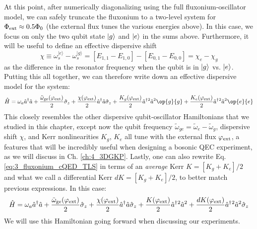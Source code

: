 At this point, after numerically diagonalizing using the full fluxonium-oscillator model, we can safely truncate the fluxonium to a two-level system for $\Phi_{\rm ext} \approx 0.5\Phi_0$ (the external flux tunes the various energies above). In this case, we focus on only the two qubit state $\lvert g\rangle$ and $\lvert e\rangle$ in the sums above. Furthermore, it will be useful to define an effective dispersive shift
\begin{equation}
    \chi \equiv \omega_s^{|e\rangle} - \omega_s^{|g\rangle} = [E_{1,1} - E_{1, 0}] - [E_{0, 1} - E_{0, 0}]  = \chi_e - \chi_g
\end{equation}
as the difference in the resonator frequency when the qubit is in $\lvert g\rangle$ vs. $\lvert e\rangle$. Putting this all together, we can therefore write down an effective dispersive model for the system: 
\begin{equation}
    \hat{H} = \omega_a \hat{a}^\dagger\hat{a} + \frac{\tilde{\omega}_{\rm ge}(\varphi_{\rm ext})}{2} \sigmaz + \frac{\chi(\varphi_{\rm ext})}{2}\hat{a}^\dagger\hat{a}\sigmaz  + \frac{K_g(\varphi_{\rm ext})}{2}\hat{a}^\dagger{}^2\hat{a}^2\op{g}{g} + \frac{K_e(\varphi_{\rm ext})}{2}\hat{a}^\dagger{}^2\hat{a}^2\op{e}{e}
\label{eq:3_fluxonium_cQED_TLS}
\end{equation}
This closely resembles the other dispersive qubit-oscillator Hamiltonians that we studied in this chapter, except now the qubit frequency $\tilde{\omega}_{ge} = \tilde{\omega}_{e} - \tilde{\omega}_{g}$, dispersive shift $\chi$, and Kerr nonlinearities $K_g$, $K_e$ all tune with the external flux $\varphi_{\rm ext}$, a features that will be incredibly useful when designing a bosonic QEC experiment, as we will discuss in Ch. \ref{ch:4_3DGKP}. Lastly, one can also rewrite Eq. \eqref{eq:3_fluxonium_cQED_TLS} in terms of an \textit{average} Kerr $K = [K_g + K_e]/2$ and what we call a differential Kerr $dK = [K_g + K_e]/2$, to better match previous expressions. In this case:
\begin{equation}
    \hat{H} = \omega_a \hat{a}^\dagger\hat{a} + \frac{\tilde{\omega}_{\rm ge}(\varphi_{\rm ext})}{2} \hat{\sigma}_z + \frac{\chi(\varphi_{\rm ext})}{2}\hat{a}^\dagger\hat{a}\hat{\sigma}_z  + \frac{K(\varphi_{\rm ext})}{2}\hat{a}^\dagger{}^2\hat{a}^2 + \frac{dK(\varphi_{\rm ext})}{2}\hat{a}^\dagger{}^2\hat{a}^2\hat{\sigma}_z
\end{equation}
We will use this Hamiltonian going forward when discussing our experiments. 